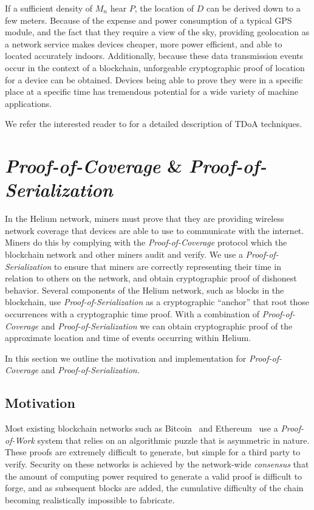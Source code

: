 \documentclass[10pt, nonatbib, nocopyrightspace, reprint]{sigplanconf}
\begin{document}
If a sufficient density of $M_n$ hear $P$, the location of $D$ can be derived down to a few meters. Because of the expense and power consumption of a typical GPS module, and the fact that they require a view of the sky, providing geolocation as a network service makes devices cheaper, more power efficient, and able to located accurately indoors. Additionally, because these data transmission events occur in the context of a blockchain, unforgeable cryptographic proof of location for a device can be obtained. Devices being able to prove they were in a specific place at a specific time has tremendous potential for a wide variety of machine applications.

We refer the interested reader to\cite{tdoa} for a detailed description of TDoA techniques.

\section{\emph{Proof-of-Coverage} \& \emph{Proof-of-Serialization}}\label{poc}

In the Helium network, miners must prove that they are providing wireless network coverage that devices are able to use to communicate with the internet. Miners do this by complying with the \emph{Proof-of-Coverage} protocol which the blockchain network and other miners audit and verify. We use a \emph{Proof-of-Serialization} to ensure that miners are correctly representing their time in relation to others on the network, and obtain cryptographic proof of dishonest behavior. Several components of the Helium network, such as blocks in the blockchain, use \emph{Proof-of-Serialization} as a cryptographic ``anchor'' that root those occurrences  with a cryptographic time proof. With a combination of \emph{Proof-of-Coverage} and \emph{Proof-of-Serialization} we can obtain cryptographic proof of the approximate location and time of events occurring within Helium.

In this section we outline the motivation and implementation for \emph{Proof-of-Coverage} and \emph{Proof-of-Serialization}.

\subsection{Motivation}

Most existing blockchain networks such as Bitcoin~\cite{bitcoin} and Ethereum~\cite{ethereum} use a \emph{Proof-of-Work} system that relies on an algorithmic puzzle that is asymmetric in nature. These proofs are extremely difficult to generate, but simple for a third party to verify. Security on these networks is achieved by the network-wide \emph{consensus} that the amount of computing power required to generate a valid proof is difficult to forge, and as subsequent blocks are added, the cumulative difficulty of the chain becoming realistically impossible to fabricate.
\end{document}
